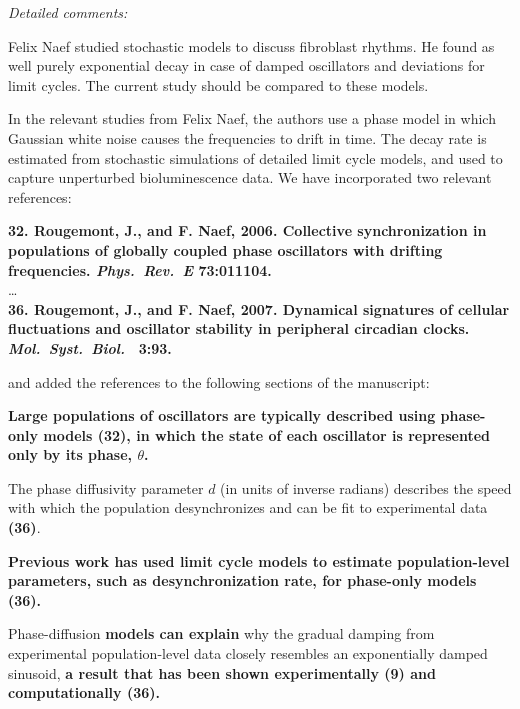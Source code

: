 \documentclass[11pt, letterpaper]{article}
\newenvironment{reviewer}{\itshape\color{gray}}{}
\newenvironment{manuscript}[1]{\begin{center}\begin{tcolorbox}[colback=green!5!white,colframe=green!75!black,width=0.8\textwidth,title={#1},breakable,fonttitle=\bfseries]}{\end{tcolorbox}\end{center}}
\begin{document}
\begin{reviewer}
Detailed comments: 
 
Felix Naef studied stochastic models to discuss fibroblast rhythms.
He found as well purely exponential decay in case of damped oscillators and deviations for limit cycles.
The current study should be compared to these models.
\end{reviewer}
 
In the relevant studies from Felix Naef, the authors use a phase model in which Gaussian white noise causes the frequencies to drift in time.
The decay rate is estimated from stochastic simulations of detailed limit cycle models, and used to capture unperturbed bioluminescence data.
We have incorporated two relevant references:

\begin{manuscript}{Page 21}
{\bfseries
32. Rougemont, J., and F. Naef, 2006. Collective synchronization in populations
of globally coupled phase oscillators with drifting frequencies. {\itshape Phys.\ Rev.\ E} 73:011104.\\}
\dots\\
{\bfseries
  36. Rougemont, J., and F. Naef, 2007. Dynamical signatures of cellular fluctuations and oscillator stability in peripheral circadian clocks. {\itshape Mol.\ Syst.\ Biol.\ } 3:93. }
\end{manuscript}

and added the references to the following sections of the manuscript:

\begin{manuscript}{Page 5}
\bfseries
Large populations of oscillators are typically described using phase-only models (32), in which the state of each oscillator is represented only by its phase, $\theta$.
\end{manuscript}
\begin{manuscript}{Page 6}
The phase diffusivity parameter $d$ (in units of inverse radians) describes the speed with which the population desynchronizes and can be fit to experimental data {\bfseries (36)}.
\end{manuscript}
\begin{manuscript}{Page 11}
\bfseries
Previous work has used limit cycle models to estimate population-level parameters, such as desynchronization rate, for phase-only models (36).
\end{manuscript}
\begin{manuscript}{Page 12}
  Phase-diffusion {\bfseries models can explain} why the gradual damping from experimental population-level data closely resembles an exponentially damped sinusoid, {\bfseries a result that has been shown experimentally (9) and computationally (36).}
\end{manuscript}
\end{document}
